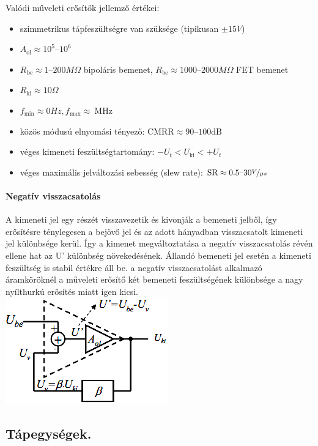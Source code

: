 Valódi műveleti erősítők jellemző értékei:
\begin{itemize}
	\item szimmetrikus tápfeszültségre van szüksége (tipikusan $\pm 15V$)
	\item $A_\text{ol} \approx 10^5 \text{--} 10^6$
	\item $R_\text{be} \approx 1 \text{--} 200 M\Omega$ bipoláris bemenet, $R_\text{be} \approx 1000 \text{--} 2000 M\Omega$ FET bemenet
	\item $R_\text{ki} \approx 10 \Omega$
	\item $f_\text{min} \approx 0 Hz, f_\text{max} \approx ~\text{MHz}$
	\item közös módusú elnyomási tényező: $\text{CMRR} \approx 90 \text{--} 100 \text{dB}$
	\item véges kimeneti feszültségtartomány: $-U_t < U_\text{ki} < +U_t$
	\item véges maximális jelváltozási sebesség (slew rate): $\text{SR} \approx 0.5 \text{--} 30 \nicefrac{V}{\mu s}$
\end{itemize}

\paragraph{Negatív visszacsatolás} A kimeneti jel egy részét visszavezetik és kivonják a bemeneti jelből, így erősítésre ténylegesen a bejövő jel és az adott hányadban visszacsatolt kimeneti jel különbsége kerül. Így a kimenet megváltoztatása a negatív visszacsatolás révén ellene hat az U’ különbség növekedésének. Állandó bemeneti jel esetén a kimeneti feszültség is stabil értékre áll be. a negatív visszacsatolást alkalmazó áramköröknél a műveleti erősítő két bemeneti feszültségének különbsége a nagy nyílthurkú erősítés miatt igen kicsi.\\
\includegraphics[width=0.5\linewidth]{fig/10-op_amp_neg_feedback}


\subsection{Tápegységek.}
